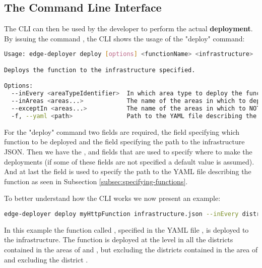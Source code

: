 \subsection{The Command Line Interface}
The CLI can then be used by the developer to perform the actual \textbf{deployment}.
By issuing the command , the CLI shows the usage of the "deploy" command:

\begin{lstlisting}[language=bash]
Usage: edge-deployer deploy [options] <functionName> <infrastructure>

Deploys the function to the infrastructure specified.

Options:
  --inEvery <areaTypeIdentifier>  In which area type to deploy the function. If not specified the function is deployed to the lowest level.
  --inAreas <areas...>            The name of the areas in which to deploy the function. If not specified the function is deployed everywhere.
  --exceptIn <areas...>           The name of the areas in which to NOT deploy the function.
  -f, --yaml <path>               Path to the YAML file describing the function. (default: "stack.yml")
\end{lstlisting}

For the "deploy" command two fields are required, the  field specifying which function to be deployed and the  field specifying the path to the infrastructure JSON.
Then we have the ,  and  fields that are used to specify where to make the deployments (if some of these fields are not specified a default value is assumed).
And at last the  field is used to specify the path to the YAML file describing the function as seen in Subsection \ref{subsec:specifying-functions}.

To better understand how the CLI works we now present an example:

\begin{lstlisting}[language=bash]
edge-deployer deploy myHttpFunction infrastructure.json --inEvery district --inAreas italy paris --exceptIn milan paris001 --yaml stack.yml
\end{lstlisting}

In this example the function called , specified in the YAML file , is deployed to the infrastructure. The function is deployed at the  level in all the districts contained in the areas of  and , but excluding the districts contained in the area of  and excluding the district .

